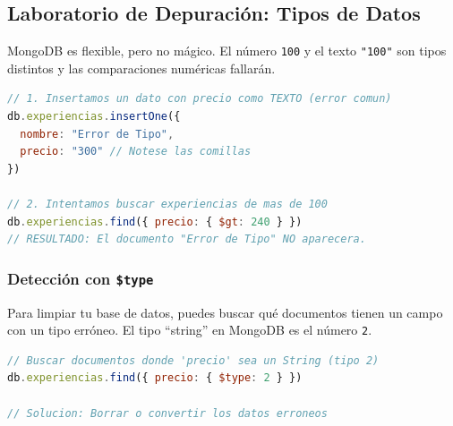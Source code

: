\documentclass[12pt,a4paper]{article}
\begin{document}
\subsection{Laboratorio de Depuración: Tipos de Datos}\label{debug}

MongoDB es flexible, pero no mágico. El número \texttt{100} y el texto \texttt{"100"} son tipos distintos y las comparaciones numéricas fallarán.

\begin{tcolorbox}[title=Peligro: Comparación de Tipos, colframe=red!75!black]
\begin{lstlisting}[language=JavaScript]
// 1. Insertamos un dato con precio como TEXTO (error comun)
db.experiencias.insertOne({ 
  nombre: "Error de Tipo", 
  precio: "300" // Notese las comillas
})

// 2. Intentamos buscar experiencias de mas de 100
db.experiencias.find({ precio: { $gt: 240 } })
// RESULTADO: El documento "Error de Tipo" NO aparecera.
\end{lstlisting}
\end{tcolorbox}

\subsubsection{Detección con \texttt{\$type}}
Para limpiar tu base de datos, puedes buscar qué documentos tienen un campo con un tipo erróneo. El tipo \enquote{string} en MongoDB es el número \texttt{2}.

\begin{lstlisting}[language=JavaScript]
// Buscar documentos donde 'precio' sea un String (tipo 2)
db.experiencias.find({ precio: { $type: 2 } })

// Solucion: Borrar o convertir los datos erroneos
\end{lstlisting}
\end{document}
